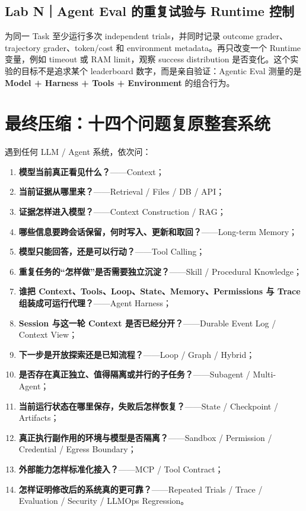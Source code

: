 \documentclass[profile=standard,twoside=false]{ipara-handbook}
\begin{document}
\subsection{Lab N｜Agent Eval 的重复试验与 Runtime 控制}

为同一 Task 至少运行多次 independent trials，并同时记录 outcome grader、trajectory grader、token/cost 和 environment metadata。再只改变一个 Runtime 变量，例如 timeout 或 RAM limit，观察 success distribution 是否变化。这个实验的目标不是追求某个 leaderboard 数字，而是亲自验证：Agentic Eval 测量的是 \textbf{Model + Harness + Tools + Environment} 的组合行为。

\section{最终压缩：十四个问题复原整套系统}

遇到任何 LLM / Agent 系统，依次问：

\begin{enumerate}
  \item \textbf{模型当前真正看见什么？}——Context；
  \item \textbf{当前证据从哪里来？}——Retrieval / Files / DB / API；
  \item \textbf{证据怎样进入模型？}——Context Construction / RAG；
  \item \textbf{哪些信息要跨会话保留，何时写入、更新和取回？}——Long-term Memory；
  \item \textbf{模型只能回答，还是可以行动？}——Tool Calling；
  \item \textbf{重复任务的“怎样做”是否需要独立沉淀？}——Skill / Procedural Knowledge；
  \item \textbf{谁把 Context、Tools、Loop、State、Memory、Permissions 与 Trace 组装成可运行代理？}——Agent Harness；
  \item \textbf{Session 与这一轮 Context 是否已经分开？}——Durable Event Log / Context View；
  \item \textbf{下一步是开放探索还是已知流程？}——Loop / Graph / Hybrid；
  \item \textbf{是否存在真正独立、值得隔离或并行的子任务？}——Subagent / Multi-Agent；
  \item \textbf{当前运行状态在哪里保存，失败后怎样恢复？}——State / Checkpoint / Artifacts；
  \item \textbf{真正执行副作用的环境与模型是否隔离？}——Sandbox / Permission / Credential / Egress Boundary；
  \item \textbf{外部能力怎样标准化接入？}——MCP / Tool Contract；
  \item \textbf{怎样证明修改后的系统真的更可靠？}——Repeated Trials / Trace / Evaluation / Security / LLMOps Regression。
\end{enumerate}
\end{document}
